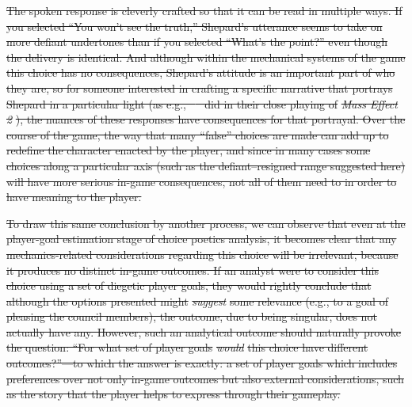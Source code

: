 \documentclass[arts,article,submit,moreauthors,pdftex,10pt,a4paper]{Definitions/mdpi}
\providecommand{\DIFdel}[1]{{\protect\color{red}\sout{#1}}}                      %
\begin{document}
\DIFdel{The spoken response is cleverly crafted so that it can be read in multiple ways.
If you selected ``You won't see the truth,'' Shepard's utterance seems to take on more defiant undertones than if you selected ``What's the point?'' even though the delivery is identical.
And although within the mechanical systems of the game this choice has no consequences, Shepard's attitude is an important part of who they are, so for someone interested in crafting a specific narrative that portrays Shepard in a particular light (as e.g., \mbox{%
\cite{bizzocchi2012mass} }\hspace{0pt}%
did in their close playing of }\emph{\DIFdel{Mass Effect 2}}%
\DIFdel{), the nuances of these responses have consequences for that portrayal.
Over the course of the game, the way that many ``false'' choices are made can add up to redefine the character enacted by the player, and since in many cases some choices along a particular axis (such as the defiant--resigned range suggested here) will have more serious in-game consequences, not all of them need to in order to have meaning to the player.
}%

\DIFdel{To draw this same conclusion by another process, we can observe that even at the player-goal estimation stage of choice poetics analysis, it becomes clear that any mechanics-related considerations regarding this choice will be irrelevant, because it produces no distinct in-game outcomes.
If an analyst were to consider this choice using a set of diegetic player goals, they would rightly conclude that although the options presented might }\emph{\DIFdel{suggest}} %
\DIFdel{some relevance (e.g., to a goal of pleasing the council members), the outcome, due to being singular, does not actually have any.
However, such an analytical outcome should naturally provoke the question: ``For what set of player goals }\emph{\DIFdel{would}} %
\DIFdel{this choice have different outcomes?''---to which the answer is exactly: a set of player goals which includes preferences over not only in-game outcomes but also external considerations, such as the story that the player helps to express through their gameplay.
}%
\end{document}
